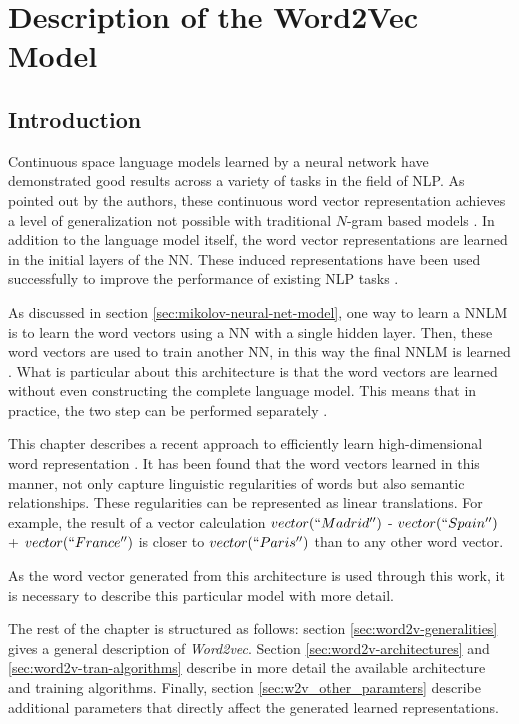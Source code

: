 \chapter{Description of the Word2Vec Model }
\label{chap:word2vec_description}


\section{Introduction}
Continuous space language  models
learned by a neural network have
demonstrated good results across a variety of tasks in the field of \ac{NLP}.  As pointed out by
the authors, these continuous word vector representation achieves a level of
generalization not possible with  traditional $N$-gram based models
\cite{conf/icassp/MikolovKBGC09}. In addition to the language model itself,
the word vector representations are learned in the initial layers of the
\ac{NN}. These 
induced representations  have been used successfully to improve the
performance of existing \ac{NLP} tasks \cite{collobert:2008}
\cite{Turian:2010:WRS:1858681.1858721}. 

As discussed in section \ref{sec:mikolov-neural-net-model},  one  way to learn a
\ac{NNLM} is to learn the word vectors using  a \ac{NN} with a single hidden
layer. Then, these word vectors are used to  train another \ac{NN}, in this 
way   the final \ac{NNLM} is learned \cite{conf/icassp/MikolovKBGC09}.   
What is particular about this architecture is that the  word  vectors are learned
 without  even constructing the complete language model.  This means
that in practice,  the two step can be performed separately \cite{conf/icassp/MikolovKBGC09}. 

This chapter describes  a recent approach to efficiently learn
high-dimensional word representation \cite{DBLP:journals/corr/abs-1301-3781}.  It has been found that the word vectors learned in this manner, 
not only capture linguistic regularities of words  but also semantic
relationships. These regularities can be represented as linear translations.
For example, the result of a vector calculation $vector(``Madrid'')$ -
$vector(``Spain'')$ + $vector(``France'')$ is closer to $vector(``Paris'')$ than to any
other word vector. \cite{DBLP:journals/corr/abs-1301-3781,MikolovSCCD13,conf/naacl/MikolovYZ13}

As the word vector generated from this architecture is used 
through this work, it is necessary to describe this particular model with more
detail.

The rest of the chapter is structured as follows: section
\ref{sec:word2v-generalities} gives a general description of
\textit{Word2vec}.  Section \ref{sec:word2v-architectures} and
\ref{sec:word2v-tran-algorithms} describe in more detail the available
architecture and training algorithms. Finally, section
\ref{sec:w2v_other_paramters} describe additional  parameters that
directly affect the generated learned representations.

